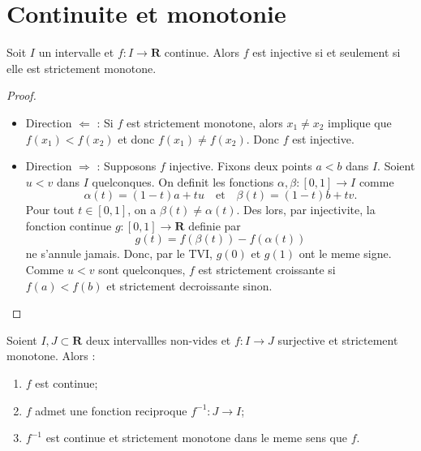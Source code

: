\section{Continuite et monotonie}
\begin{theorem}
Soit $I$ un intervalle et $f:I\to \mathbf{R}$ continue. Alors $f$ est injective si et seulement si elle est strictement monotone. 
\end{theorem}
\begin{proof}
\begin{itemize}
\item Direction $\Leftarrow$ : Si $f$ est strictement monotone, alors $x_{1}\neq x_{2}$ implique que $f(x_{1})<f(x_{2})$ et donc $f(x_{1})\neq f(x_{2})$. Donc $f$ est injective. 
\item Direction $\Rightarrow$ : Supposons $f$ injective. Fixons deux points $a<b$ dans $I$. Soient $u<v$ dans $I$ quelconques. On definit les fonctions $\alpha,\beta:[0,1]\to I$ comme
$$
\alpha(t)=(1-t)a+tu\quad \text{et}\quad \beta(t)=(1-t)b + tv.
$$
Pour tout $t\in[0,1]$, on a $\beta(t)\neq\alpha(t)$. Des lors, par injectivite, la fonction continue $g:[0,1]\to \mathbf{R}$ definie par
$$
g(t)=f(\beta (t))-f(\alpha(t))
$$
ne s'annule jamais. Donc, par le TVI, $g(0)$ et $g(1)$ ont le meme signe. Comme $u<v$ sont quelconques, $f$ est strictement croissante si $f(a)<f(b)$ et strictement decroissante sinon.
\end{itemize}
\end{proof}
\begin{theorem}
Soient $I,J\subset \mathbf{R}$ deux intervallles non-vides et $f:I\to J$ surjective et strictement monotone. Alors :
\begin{enumerate}
\item $f$ est continue;
\item $f$ admet une fonction reciproque $f^{-1}:J\to I$;
\item $f^{-1}$ est continue et strictement monotone dans le meme sens que $f$.
\end{enumerate}
\end{theorem}
